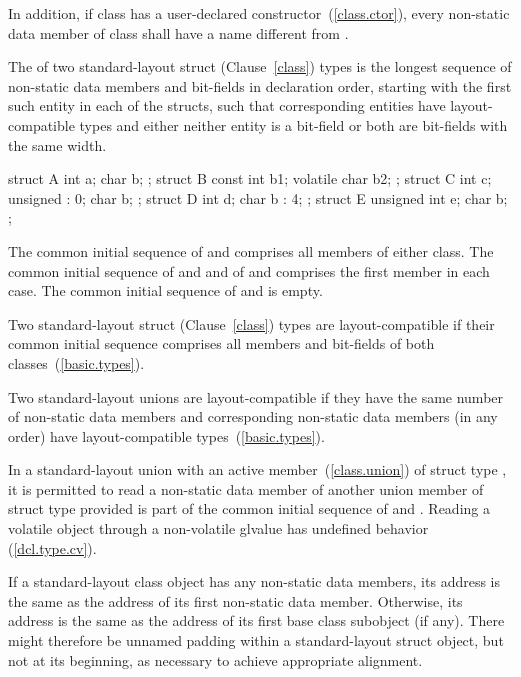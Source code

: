 \pnum
In addition, if class  has a user-declared
constructor~(\ref{class.ctor}), every non-static data member of class
 shall have a name different from .

\pnum
The  of two standard-layout struct (Clause~\ref{class})
types is the longest sequence of non-static data
members and bit-fields in declaration order, starting with the first
such entity in each of the structs, such that corresponding entities
have layout-compatible types and either neither entity is a bit-field or
both are bit-fields with the same width.
\enterexample
\begin{codeblock}
  struct A { int a; char b; };
  struct B { const int b1; volatile char b2; };
  struct C { int c; unsigned : 0; char b; };
  struct D { int d; char b : 4; };
  struct E { unsigned int e; char b; };
\end{codeblock}
The common initial sequence of  and  comprises all members
of either class. The common initial sequence of  and  and
of  and  comprises the first member in each case.
The common initial sequence of  and  is empty.
\exitexample

\pnum
Two standard-layout struct (Clause~\ref{class}) types are layout-compatible if
their common initial sequence comprises all members and bit-fields of
both classes~(\ref{basic.types}).

\pnum
Two standard-layout unions are layout-compatible if they
have the same number of non-static data members and corresponding
non-static data members (in any order) have layout-compatible
types~(\ref{basic.types}).

\pnum
In a standard-layout union with an active member~(\ref{class.union})
of struct type , it is permitted to read a non-static
data member  of another union member of struct type 
provided  is part of the common initial sequence of  and .
\enternote
Reading a volatile object through a non-volatile glvalue has
undefined behavior (\ref{dcl.type.cv}).
\exitnote

\pnum
If a standard-layout class object has any non-static data members, its address
is the same as the address of its first non-static data member. Otherwise, its
address is the same as the address of its first base class subobject (if any).
\enternote
There might therefore be unnamed padding within a standard-layout struct object, but
not at its beginning, as necessary to achieve appropriate alignment.
\exitnote

